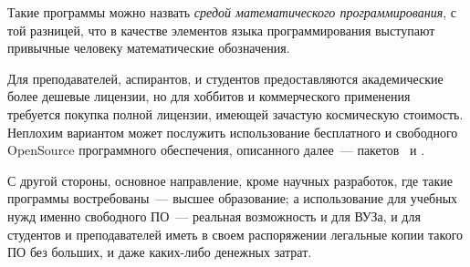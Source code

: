 Такие программы можно назвать \emph{средой математического программирования}, с
той разницей, что в качестве элементов языка программирования выступают
привычные человеку математические обозначения.

Для преподавателей, аспирантов, и студентов предоставляются академические более
дешевые лицензии, но для хоббитов и коммерческого применения требуется покупка
полной лицензии, имеющей зачастую космическую стоимость. Неплохим вариантом
может послужить использование бесплатного и свободного OpenSource программного
обеспечения, описанного далее\ --- пакетов \  и .

С другой стороны, основное направление, кроме научных разработок, где такие
программы востребованы\ --- высшее образование; а использование для учебных нужд
именно свободного ПО\ --- реальная возможность и для ВУЗа, и для студентов и
преподавателей иметь в своем распоряжении легальные копии такого ПО без больших,
и даже каких-либо денежных затрат.






\secup
